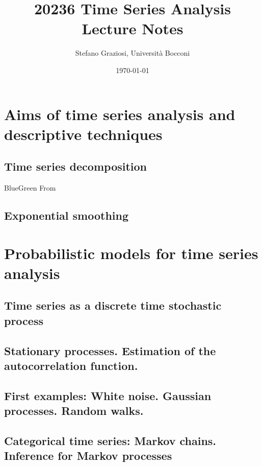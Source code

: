 \documentclass[dvipsnames,12pt]{book}
\title{20236 Time Series Analysis \\[1cm] \textbf{Lecture Notes}}
\author{Stefano Graziosi, Università Bocconi}
\date{\today}
\begin{document}
\maketitle

\tableofcontents

\part*{Aims of time series analysis and descriptive techniques}

    \chapter{Time series decomposition}

        \begin{mybox}{BlueGreen}{}
            From
        \end{mybox}

    \chapter{Exponential smoothing}

\part{Probabilistic models for time series analysis}

    \chapter{Time series as a discrete time stochastic process}

    \chapter[Stationary processes]{Stationary processes. Estimation of the autocorrelation function.}

    \chapter[White noise. Gaussian processes. Random walks.]{First examples: White noise. Gaussian processes. Random walks.}

    \chapter[Markov chains. Inference for Markov processes]{Categorical time series: Markov chains. Inference for Markov processes}
\end{document}
